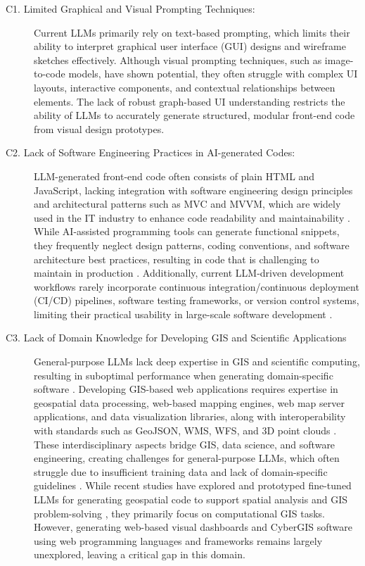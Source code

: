 \begin{description} 
   \item[C1. Limited Graphical and Visual Prompting Techniques:] Current LLMs primarily rely on text-based prompting, which limits their ability to interpret graphical user interface (GUI) designs and wireframe sketches effectively. Although visual prompting techniques, such as image-to-code models, have shown potential, they often struggle with complex UI layouts, interactive components, and contextual relationships between elements. The lack of robust graph-based UI understanding restricts the ability of LLMs to accurately generate structured, modular front-end code from visual design prototypes.

    \item[C2. Lack of Software Engineering Practices in AI-generated Codes:] 
    LLM-generated front-end code often consists of plain HTML and JavaScript, lacking integration with software engineering design principles and architectural patterns such as MVC and MVVM, which are widely used in the IT industry to enhance code readability and maintainability \citep{xiao2024prototype2code}. While AI-assisted programming tools can generate functional snippets, they frequently neglect design patterns, coding conventions, and software architecture best practices, resulting in code that is challenging to maintain in production \citep{ghoshdesign, nguyen2023generative}. Additionally, current LLM-driven development workflows rarely incorporate continuous integration/continuous deployment (CI/CD) pipelines, software testing frameworks, or version control systems, limiting their practical usability in large-scale software development \citep{corona2025question, mendoza2024development}.
   
   \item[C3. Lack of Domain Knowledge for Developing GIS and Scientific Applications] 
   General-purpose LLMs lack deep expertise in GIS and scientific computing, resulting in suboptimal performance when generating domain-specific software \citep{zhang2024bb, mansourian2024chatgeoai}. Developing GIS-based web applications requires expertise in geospatial data processing, web-based mapping engines, web map server applications, and data visualization libraries, along with interoperability with standards such as GeoJSON, WMS, WFS, and 3D point clouds \citep{xu2024semi, xu2019web, berres2021multiscale}. These interdisciplinary aspects bridge GIS, data science, and software engineering, creating challenges for general-purpose LLMs, which often struggle due to insufficient training data and lack of domain-specific guidelines \citep{hou2024can}. While recent studies have explored and prototyped fine-tuned LLMs for generating geospatial code to support spatial analysis and GIS problem-solving \citep{hadid2024geoscience, hou2024geocode, akinboyewa2024gis}, they primarily focus on computational GIS tasks. However, generating web-based visual dashboards and CyberGIS software using web programming languages and frameworks remains largely unexplored, leaving a critical gap in this domain.
 

\end{description}
